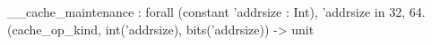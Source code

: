 __cache_maintenance : forall (constant 'addrsize : Int), 'addrsize in {32, 64}.
  (cache_op_kind, int('addrsize), bits('addrsize)) -> unit